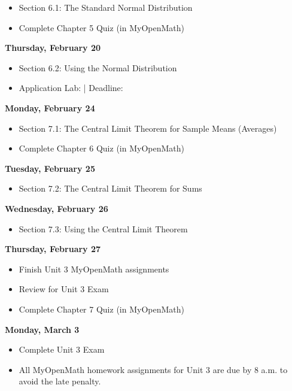 \documentclass[11pt]{article}
\begin{document}
\begin{itemize}
\item Section 6.1: The Standard Normal Distribution
\item Complete Chapter 5 Quiz (in MyOpenMath)
\end{itemize}

\textbf{Thursday, February 20}

\begin{itemize}
\item Section 6.2: Using the Normal Distribution
\item Application Lab: | Deadline:
\end{itemize}

\textbf{Monday, February 24}

\begin{itemize}
\item Section 7.1: The Central Limit Theorem for Sample Means (Averages)
\item Complete Chapter 6 Quiz (in MyOpenMath)
\end{itemize}

\textbf{Tuesday, February 25}

\begin{itemize}
\item Section 7.2: The Central Limit Theorem for Sums
\end{itemize}

\textbf{Wednesday, February 26}

\begin{itemize}
\item Section 7.3: Using the Central Limit Theorem
\end{itemize}

\textbf{Thursday, February 27}

\begin{itemize}
\item Finish Unit 3 MyOpenMath assignments
\item Review for Unit 3 Exam
\item Complete Chapter 7 Quiz (in MyOpenMath)
\end{itemize}

\textbf{Monday, March 3}

\begin{itemize}
\item Complete Unit 3 Exam
\item All MyOpenMath homework assignments for Unit 3 are due by 8 a.m. to avoid the late penalty.
\end{itemize}
\end{document}
